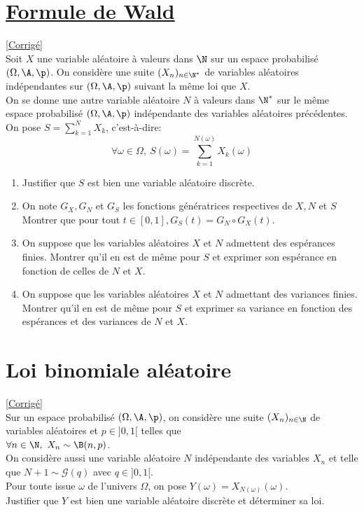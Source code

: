 \documentclass[8pt]{book}
\begin{document}
\section{\underline{Formule de Wald} }
\label{Formule de Wald}
\textcolor{blue}{\hyperref[Formule de Wald corrigé]{[Corrigé]}}\\
Soit $X$ une variable aléatoire à valeurs dans $\N$ sur un espace probabilisé $(\Omega,\A,\p)$. On considère une suite $(X_n)_{n\in\N^*}$ de variables aléatoires indépendantes sur $(\Omega,\A,\p)$ suivant la même loi que $X$.
\\ On se donne une autre variable aléatoire $N$ à valeurs dans $\N^*$ sur le même espace probabilisé $(\Omega,\A,\p)$ indépendante des variables aléatoires précédentes.
\\ On pose $S=\displaystyle\sum\limits_{k=1}^{N}X_k$, c'est-à-dire: $$\forall \omega\in\Omega,\ S(\omega)=\sum\limits_{k=1}^{N(\omega)}X_k(\omega)$$
\begin{enumerate}
	\item Justifier que $S$ est bien une variable aléatoire discrète.
	\item On note $G_X,G_N$ et $G_S$ les fonctions génératrices respectives de $X,N$ et $S$ Montrer que pour tout $t\in[0,1],G_S(t)=G_N\circ G_X(t)$.
	\item On suppose que les variables aléatoires $X$ et $N$ admettent des espérances finies. Montrer qu'il en est de même pour $S$ et exprimer son espérance en fonction de celles de $N$ et $X$.
	\item On suppose que les variables aléatoires $X$ et $N$ admettant des variances finies. Montrer qu'il en est de même pour $S$ et exprimer sa variance en fonction des espérances et des variances de $N$ et $X$.
\end{enumerate}

\section{Loi binomiale aléatoire }
\label{Loi binomiale aléatoire}
\textcolor{blue}{\hyperref[Loi binomiale aléatoire corrigé]{[Corrigé]}}\\
Sur un espace probabilisé $(\Omega,\A,\p)$, on considère une suite $(X_n)_{n\in \N}$ de variables aléatoires et $p\in ]0,1[$ telles que\\
$\forall n\in \N,\ X_n\sim \B(n,p)$.\\
On considère aussi une variable aléatoire $N$ indépendante des variables $X_n$ et telle que $N+1\sim \mathcal{G}(q)$ avec $q\in ]0,1[$.\\
Pour toute issue $\omega$ de l'univers $\Omega$, on pose $Y(\omega)=X_{N(\omega)}(\omega)$.\\
Justifier que $Y$ est bien une variable aléatoire discrète et déterminer sa loi.
\end{document}
